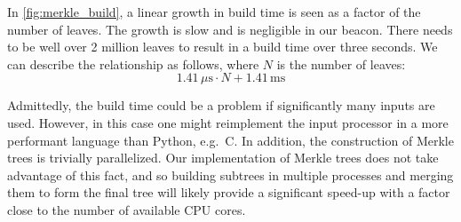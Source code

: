 In \cref{fig:merkle_build}, a linear growth in build time is seen as a factor of the number of leaves.
The growth is slow and is negligible in our beacon.
There needs to be well over 2 million leaves to result in a build time over three seconds.
We can describe the relationship as follows, where $N$ is the number of leaves:
$$
1.41\,\mu\text{s} \cdot N + 1.41\,\text{ms}
$$

Admittedly, the build time could be a problem if significantly many inputs are used.
However, in this case one might reimplement the input processor in a more performant language than Python, e.g.\ C.
In addition, the construction of Merkle trees is trivially parallelized.
Our implementation of Merkle trees does not take advantage of this fact, and so building subtrees in multiple processes and merging them to form the final tree will likely provide a significant speed-up with a factor close to the number of available CPU cores.